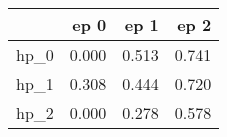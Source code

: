 \begin{tabular}{lrrr}
\toprule
{} &   ep 0 &   ep 1 &   ep 2 \\
\midrule
hp\_0 &  0.000 &  0.513 &  0.741 \\
hp\_1 &  0.308 &  0.444 &  0.720 \\
hp\_2 &  0.000 &  0.278 &  0.578 \\
\bottomrule
\end{tabular}
